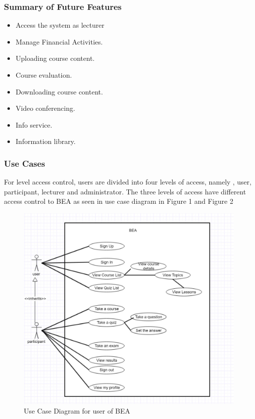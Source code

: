 \documentclass{scrartcl}
\begin{document}
  	\subsubsection{Summary of Future Features}
  	\begin{itemize}
  	\item Access the system as lecturer
  	\item Manage Financial Activities.
  	\item Uploading course content.
  	\item Course evaluation.
  	\item Downloading course content.
  	\item Video conferencing.
  	\item Info service.
  	\item Information library.
  	\end{itemize}
  	
  	
  	\subsubsection{Use Cases }
  	For level access control, users are divided into four levels of access, namely , user, participant, lecturer and administrator. The three levels of access have different access control to BEA  as seen in use case diagram in Figure 1  and Figure 2
  	\begin{figure}[H]
\centering
\includegraphics[width=150mm]{ucd_user.JPG}
\caption{Use Case Diagram for user of BEA}
\label{ucd_user}
\end{figure}
\end{document}
